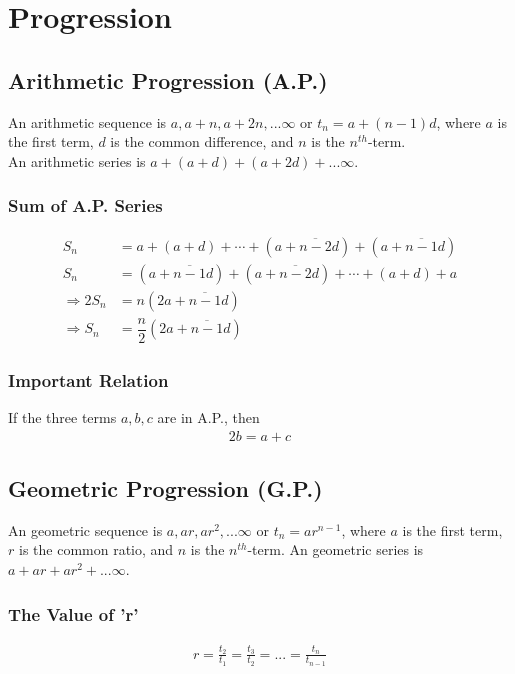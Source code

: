 \documentclass[../main.tex]{subfiles}
\begin{document}
	\chapter{Progression}
	
	\section{Arithmetic Progression (A.P.)}
	An arithmetic sequence is $a,a+n,a+2n,...\infty$ or $t_n = a+(n-1)d$, where $a$ is the first term, $d$ is the common difference, and $n$ is the $n^{th}$-term.\\
	An arithmetic series is $a+(a+d)+(a+2d)+...\infty$.
	
	\begin{strip}
		\subsection{Sum of A.P. Series}
		\begin{align}
			S_n & = a + (a + d)+ \cdots + (a + \overline{n-2}d) + (a + \overline{n-1}d) \nonumber\\
			S_n & = (a + \overline{n-1}d) + (a + \overline{n-2} d) + \cdots +(a + d) + a \nonumber\\
			\Rightarrow 2S_n & = n(2a + \overline{n - 1}d) \nonumber\\
			\Rightarrow S_n & = \dfrac{n}{2} (2a + \overline{n - 1} d)
		\end{align}
	\end{strip}

	\subsection{Important Relation}
	If the three terms $a,b,c$ are in A.P., then
	\begin{align}
		2b=a+c
	\end{align}
	
	
	\section{Geometric Progression (G.P.)}
	An geometric sequence is $a,ar,ar^2,...\infty$ or $t_n=ar^{n-1}$, where $a$ is the first term, $r$ is the common ratio, and $n$ is the $n^{th}$-term.
	An geometric series is $a+ar+ar^2+...\infty$.
	\subsection{The Value of 'r'}
	\begin{align}
		r=\frac{t_2}{t_1}=\frac{t_3}{t_2}=...=\frac{t_{n}}{t_{n-1}}
	\end{align}
	
\end{document}
